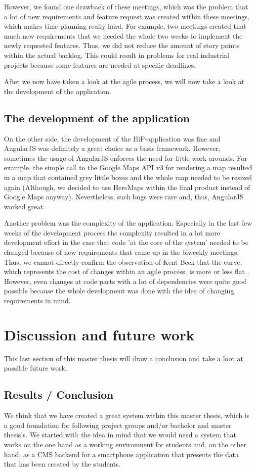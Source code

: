 However, we found one drawback of these meetings, which was the problem that a lot of new requirements and feature request was created within these meetings, which makes time-planning really hard. For example, two meetings created that much new requirements that we needed the whole two weeks to implement the newly requested features. Thus, we did not reduce the amount of story points within the actual backlog. This could result in problems for real industrial projects because some features are needed at specific deadlines.

After we now have taken a look at the agile process, we will now take a look at the development of the application.   

\subsection{The development of the application}
On the other side, the development of the \ac{HiP}-application was fine and AngularJS was definitely a great choice as a basis framework. However, sometimes the usage of AngularJS enforces the need for little work-arounds. For example, the simple call to the Google Maps API v3 for rendering a map resulted in a map that contained grey little boxes and the whole map needed to be resized again (Although, we decided to use HereMaps within the final product instead of Google Maps anyway). Nevertheless, such bugs were rare and, thus, AngularJS worked great. 

Another problem was the complexity of the application. Especially in the last few weeks of the development process the complexity resulted in a lot more development effort in the case that code 'at the core of the system' needed to be changed because of new requirements that came up in the biweekly meetings. Thus, we cannot directly confirm the observation of Kent Beck that the curve, which represents the cost of changes within an agile process, is more or less flat \cite{beck2003test}. However, even changes at code parts with a lot of dependencies were quite good possible because the whole development was done with the idea of changing requirements in mind. 

\section{Discussion and future work}
This last section of this master thesis will draw a conclusion and take a loot at possible future work.

\subsection{Results / Conclusion}
We think that we have created a great system within this master thesis, which is a good foundation for following project groups and/or bachelor and master thesis's. We started with the idea in mind that we would need a system that works on the one hand as a working environment for students and, on the other hand, as a \ac{CMS} backend for a smartphone application that presents the data that has been created by the students. 

